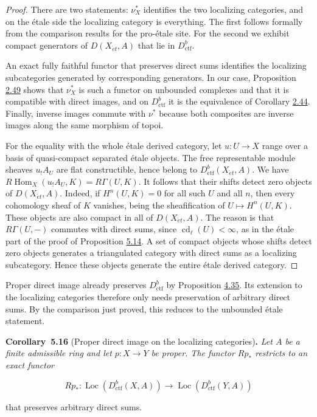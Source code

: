 \documentclass[11pt]{article}
\newenvironment{bpstatement}[2]{\par\addvspace{0.6\baselineskip}\noindent\textbf{#1}#2\textbf{.}\enspace\ignorespaces}
  {\par\addvspace{0.4\baselineskip}}
\newenvironment{bpstatementit}[2]{\begin{bpstatement}{#1}{#2}\itshape\ignorespaces}{\end{bpstatement}}
\providecommand{\Loc}{}\renewcommand{\Loc}{\operatorname{Loc}}
\begin{document}
\begin{proof}[{Proof}]\label{bp455}%
There are two statements: \(\nu_X^*\) identifies the two localizing categories, and on the étale side the localizing category is everything. The first follows formally from the comparison results for the pro-étale site. For the second we exhibit compact generators of \(D(X_{\acute{e}t},A)\) that lie in \(D^b_{\mathrm{ctf}}\).

An exact fully faithful functor that preserves direct sums identifies the localizing subcategories generated by corresponding generators. In our case, Proposition \hyperref[bp146]{2.49} shows that \(\nu_X^*\) is such a functor on unbounded complexes and that it is compatible with direct images, and on \(D^b_{\mathrm{ctf}}\) it is the equivalence of Corollary \hyperref[bp132]{2.44}. Finally, inverse images commute with \(\nu^*\) because both composites are inverse images along the same morphism of topoi.

For the equality with the whole étale derived category, let \(u:U\to X\) range over a basis of quasi-compact separated étale objects. The free representable module sheaves \(u_!A_U\) are flat constructible, hence belong to \(D^b_{\mathrm{ctf}}(X_{\acute{e}t},A)\). We have \(R\!\operatorname{Hom}_X(u_!A_U,K)=R\Gamma(U,K)\). It follows that their shifts detect zero objects of \(D(X_{\acute{e}t},A)\). Indeed, if \(H^n(U,K)=0\) for all such \(U\) and all \(n\), then every cohomology sheaf of \(K\) vanishes, being the sheafification of \(U\mapsto H^n(U,K)\). These objects are also compact in all of \(D(X_{\acute{e}t},A)\). The reason is that \(R\Gamma(U,-)\) commutes with direct sums, since \(\operatorname{cd}_\ell(U)<\infty\), as in the étale part of the proof of Proposition \hyperref[bp451]{5.14}. A set of compact objects whose shifts detect zero objects generates a triangulated category with direct sums as a localizing subcategory. Hence these objects generate the entire étale derived category.
\end{proof}

\label{bp456}%
Proper direct image already preserves \(D^b_{\mathrm{ctf}}\) by Proposition \hyperref[bp390]{4.35}. Its extension to the localizing categories therefore only needs preservation of arbitrary direct sums. By the comparison just proved, this reduces to the unbounded étale statement.

\label{bp457}%
\begin{bpstatementit}{Corollary~5.16}{ (Proper direct image on the localizing categories)}
Let \(A\) be a finite admissible ring and let \(p:X\to Y\) be proper. The functor \(Rp_*\) restricts to an exact functor

\[
Rp_*:\Loc(D^b_{\mathrm{ctf}}(X,A))\longrightarrow\Loc(D^b_{\mathrm{ctf}}(Y,A))
\]

that preserves arbitrary direct sums.
\end{bpstatementit}
\end{document}
